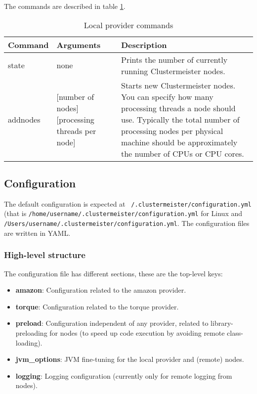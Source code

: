 The commands are described in table \ref{tab:localprovider}.

\begin{table}[h]
\centering
\begin{tabular}{|l| p{3cm} | p{6cm}|}
\hline
\textbf{Command} & \textbf{Arguments} & \textbf{Description} \\ \hline
state & none & Prints the number of currently running Clustermeister nodes. \\ \hline
addnodes & [number of nodes] [processing threads per node] & Starts new Clustermeister nodes. You can specify how many processing threads a node should use. Typically the total number of processing nodes per physical machine should be approximately the number of CPUs or CPU cores. \\ \hline
\end{tabular}
\caption{Local provider commands}
\label{tab:localprovider}
\end{table}


\subsection{Configuration}

\label{configuration}

The default configuration is expected at \texttt{~/.clustermeister/configuration.yml} (that is \texttt{/home/username/.clustermeister/configuration.yml} for Linux and \texttt{/Users/username/.clustermeister/configuration.yml}. The configuration files are written in YAML.

\subsubsection{High-level structure}

The configuration file has different sections, these are the top-level keys:

\begin{itemize}
 \item \textbf{amazon}: Configuration related to the amazon provider.
 \item \textbf{torque}: Configuration related to the torque provider.
 \item \textbf{preload}: Configuration independent of any provider, related to library-preloading for nodes (to speed up code execution by avoiding remote class-loading).
 \item \textbf{jvm\_options}: JVM fine-tuning for the local provider and (remote) nodes.
 \item \textbf{logging}: Logging configuration (currently only for remote logging from nodes).
\end{itemize}

